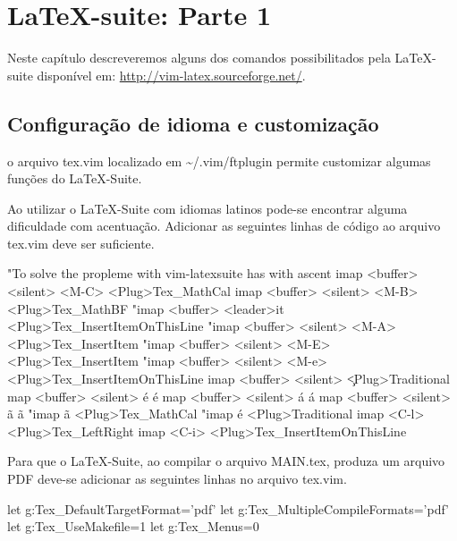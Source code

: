 % 
% 
% 
% 
% 
\chapter{LaTeX-suite: Parte 1} \label{V:LaTeX1}
Neste capítulo descreveremos alguns dos comandos possibilitados pela LaTeX-suite disponível em: \url{http://vim-latex.sourceforge.net/}.

\section{Configuração de idioma e customização}
o arquivo \textsf{tex.vim} localizado em \textsf{\textasciitilde/.vim/ftplugin} permite customizar algumas funções do LaTeX-Suite.

Ao utilizar o LaTeX-Suite com idiomas latinos pode-se encontrar alguma dificuldade com acentuação. Adicionar as seguintes linhas de código ao arquivo \textsf{tex.vim} deve ser suficiente.
\begin{code}
    "To solve the propleme with vim-latexsuite has with ascent
    imap <buffer> <silent> <M-C> <Plug>Tex_MathCal
    imap <buffer> <silent> <M-B> <Plug>Tex_MathBF
    "imap <buffer> <leader>it <Plug>Tex_InsertItemOnThisLine
    "imap <buffer> <silent> <M-A>  <Plug>Tex_InsertItem
    "imap <buffer> <silent> <M-E>  <Plug>Tex_InsertItem
    "imap <buffer> <silent> <M-e>  <Plug>Tex_InsertItemOnThisLine
    imap <buffer> <silent> \c <Plug>Traditional
    map <buffer> <silent> é  é
    map <buffer> <silent> á  á
    map <buffer> <silent> ã  ã
    "imap ã <Plug>Tex_MathCal
    "imap é <Plug>Traditional
    imap <C-l> <Plug>Tex_LeftRight
    imap <C-i> <Plug>Tex_InsertItemOnThisLine
\end{code}

Para que o LaTeX-Suite, ao compilar o arquivo \textsf{MAIN.tex}, produza um arquivo PDF deve-se adicionar as seguintes linhas no arquivo \textsf{tex.vim}.
\begin{code}
    let g:Tex_DefaultTargetFormat='pdf'
    let g:Tex_MultipleCompileFormats='pdf'
    let g:Tex_UseMakefile=1
    let g:Tex_Menus=0
\end{code}

